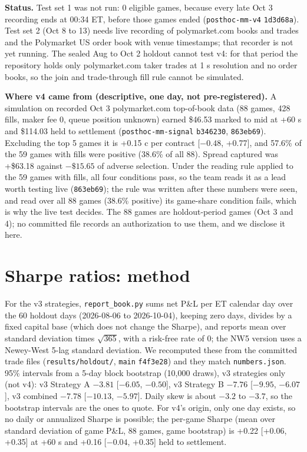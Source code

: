 \documentclass[11pt]{article}
\begin{document}
\textbf{Status.} Test set 1 was not run: 0 eligible games, because every late Oct 3 recording ends at 00:34 ET, before those games ended (\texttt{posthoc-mm-v4} \texttt{1d3d68a}). Test set 2 (Oct 8 to 13) needs live recording of polymarket.com books and trades and the Polymarket US order book with venue timestamps; that recorder is not yet running. The sealed Aug to Oct 2 holdout cannot test v4: for that period the repository holds only polymarket.com taker trades at 1 s resolution and no order books, so the join and trade-through fill rule cannot be simulated.

\textbf{Where v4 came from (descriptive, one day, not pre-registered).} A simulation on recorded Oct 3 polymarket.com top-of-book data (88 games, 428 fills, maker fee 0, queue position unknown) earned \$46.53 marked to mid at +60 s and \$114.03 held to settlement (\texttt{posthoc-mm-signal} \texttt{b346230}, \texttt{863eb69}). Excluding the top 5 games it is +0.15 c per contract [$-0.48$, +0.77], and 57.6\% of the 59 games with fills were positive (38.6\% of all 88). Spread captured was +\$63.18 against $-\$15.65$ of adverse selection. Under the reading rule applied to the 59 games with fills, all four conditions pass, so the team reads it as a lead worth testing live (\texttt{863eb69}); the rule was written after these numbers were seen, and read over all 88 games (38.6\% positive) its game-share condition fails, which is why the live test decides. The 88 games are holdout-period games (Oct 3 and 4); no committed file records an authorization to use them, and we disclose it here.


\section{Sharpe ratios: method}\label{app:sharpe}

For the v3 strategies, \texttt{report\_book.py} sums net P\&L per ET calendar day over the 60 holdout days (2026-08-06 to 2026-10-04), keeping zero days, divides by a fixed capital base (which does not change the Sharpe), and reports mean over standard deviation times $\sqrt{365}$, with a risk-free rate of 0; the NW5 version uses a Newey-West 5-lag standard deviation. We recomputed these from the committed trade files (\texttt{results/holdout/}, \texttt{main} \texttt{f4f3e28}) and they match \texttt{numbers.json}. 95\% intervals from a 5-day block bootstrap (10,000 draws), v3 strategies only (not v4): v3 Strategy A $-3.81$ [$-6.05$, $-0.50$], v3 Strategy B $-7.76$ [$-9.95$, $-6.07$], v3 combined $-7.78$ [$-10.13$, $-5.97$]. Daily skew is about $-3.2$ to $-3.7$, so the bootstrap intervals are the ones to quote. For v4's origin, only one day exists, so no daily or annualized Sharpe is possible; the per-game Sharpe (mean over standard deviation of game P\&L, 88 games, game bootstrap) is +0.22 [+0.06, +0.35] at +60 s and +0.16 [$-0.04$, +0.35] held to settlement.
\end{document}
